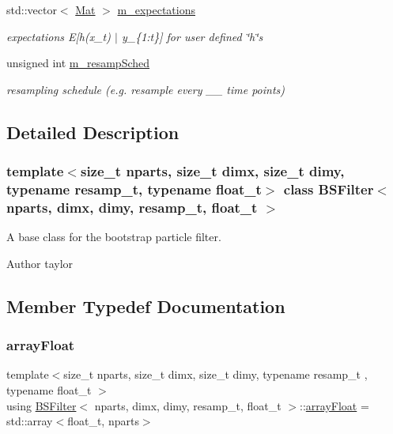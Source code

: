 \begin{DoxyCompactItemize}
\mbox{\label{classBSFilter_afc613fc34025a80b7745ae1e191c78c0}} 
std\+::vector$<$ \hyperlink{classBSFilter_a8ec8e8477e12686e706e7d7aa5c2971c}{Mat} $>$ \hyperlink{classBSFilter_afc613fc34025a80b7745ae1e191c78c0}{m\+\_\+expectations}
\begin{DoxyCompactList}\small\item\em expectations E\mbox{[}h(x\+\_\+t) $\vert$ y\+\_\+\{1\+:t\}\mbox{]} for user defined \char`\"{}h\char`\"{}s \end{DoxyCompactList}\item 
\mbox{\label{classBSFilter_a3ae16f95c62e798c64150d3bb1451c9c}} 
unsigned int \hyperlink{classBSFilter_a3ae16f95c62e798c64150d3bb1451c9c}{m\+\_\+resamp\+Sched}
\begin{DoxyCompactList}\small\item\em resampling schedule (e.\+g. resample every \+\_\+\+\_\+ time points) \end{DoxyCompactList}\end{DoxyCompactItemize}


\subsection{Detailed Description}
\subsubsection*{template$<$size\+\_\+t nparts, size\+\_\+t dimx, size\+\_\+t dimy, typename resamp\+\_\+t, typename float\+\_\+t$>$\newline
class B\+S\+Filter$<$ nparts, dimx, dimy, resamp\+\_\+t, float\+\_\+t $>$}

A base class for the bootstrap particle filter. 

\begin{DoxyAuthor}{Author}
taylor 
\end{DoxyAuthor}


\subsection{Member Typedef Documentation}
\mbox{\label{classBSFilter_a14a572439ddfe7d2b4157d4c91617981}} 
\subsubsection{\texorpdfstring{array\+Float}{arrayFloat}}
{\footnotesize\ttfamily template$<$size\+\_\+t nparts, size\+\_\+t dimx, size\+\_\+t dimy, typename resamp\+\_\+t , typename float\+\_\+t $>$ \\
using \hyperlink{classBSFilter}{B\+S\+Filter}$<$ nparts, dimx, dimy, resamp\+\_\+t, float\+\_\+t $>$\+::\hyperlink{classBSFilter_a14a572439ddfe7d2b4157d4c91617981}{array\+Float} =  std\+::array$<$float\+\_\+t, nparts$>$}

